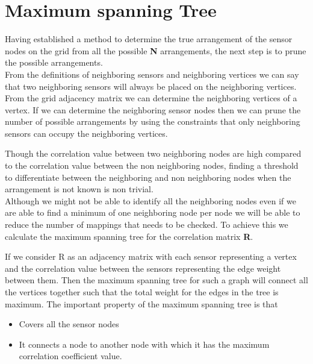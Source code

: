 \section{Maximum spanning Tree}
Having established a method to determine the true arrangement of the sensor nodes on the grid from all the possible \textbf{N} arrangements, the next step is to prune the possible arrangements. \\
From the definitions of neighboring sensors and neighboring vertices we can say that two neighboring sensors will always be placed on the neighboring vertices. From the grid adjacency matrix we can determine the neighboring vertices of a vertex. If we can determine the neighboring sensor nodes then we can prune the number of possible arrangements by using the constraints that only neighboring sensors can occupy the neighboring vertices. 






Though the correlation value between two neighboring nodes are high compared to the correlation value between the non neighboring nodes, finding a threshold to differentiate between the neighboring and non neighboring nodes when the arrangement is not known is non trivial.\\
Although we might not be able to identify all the neighboring nodes even if we are able to find a minimum of one neighboring node per node we will be able to reduce the number of mappings that needs to be checked. To achieve this we calculate the maximum spanning tree for the correlation matrix \textbf{R}.

If we consider R as an adjacency matrix with each sensor representing a vertex and the correlation value between the sensors representing the edge weight between them. Then the maximum spanning tree for such a graph will connect all the vertices together such that the total weight for the edges in the tree is maximum. The important property of the maximum spanning tree is that 
\begin{itemize}
\item Covers all the sensor nodes
\item It connects a node to another node with which it has the maximum correlation coefficient value.
\end{itemize}


